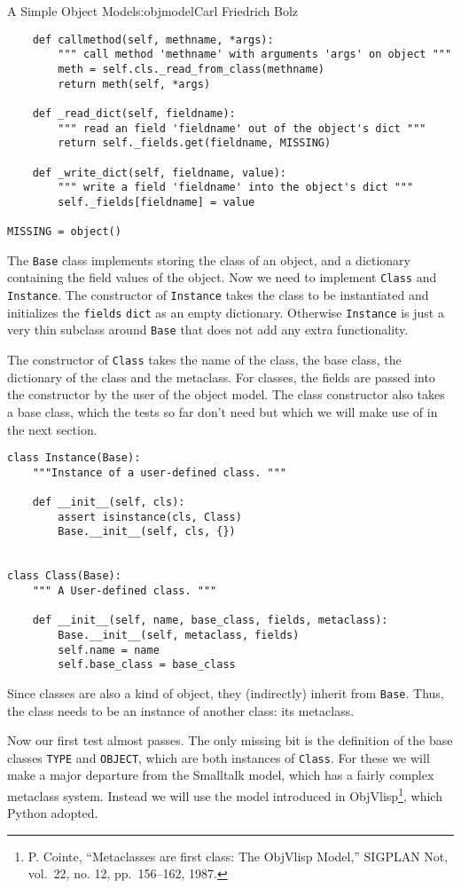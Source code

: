 \begin{aosachapter}{A Simple Object Model}{s:objmodel}{Carl Friedrich Bolz}
\begin{verbatim}
    def callmethod(self, methname, *args):
        """ call method 'methname' with arguments 'args' on object """
        meth = self.cls._read_from_class(methname)
        return meth(self, *args)

    def _read_dict(self, fieldname):
        """ read an field 'fieldname' out of the object's dict """
        return self._fields.get(fieldname, MISSING)

    def _write_dict(self, fieldname, value):
        """ write a field 'fieldname' into the object's dict """
        self._fields[fieldname] = value

MISSING = object()
\end{verbatim}

The \texttt{Base} class implements storing the class of an object, and a
dictionary containing the field values of the object. Now we need to
implement \texttt{Class} and \texttt{Instance}. The constructor of
\texttt{Instance} takes the class to be instantiated and initializes the
\texttt{fields} \texttt{dict} as an empty dictionary. Otherwise
\texttt{Instance} is just a very thin subclass around \texttt{Base} that
does not add any extra functionality.

The constructor of \texttt{Class} takes the name of the class, the base
class, the dictionary of the class and the metaclass. For classes, the
fields are passed into the constructor by the user of the object model.
The class constructor also takes a base class, which the tests so far
don't need but which we will make use of in the next section.

\begin{verbatim}
class Instance(Base):
    """Instance of a user-defined class. """

    def __init__(self, cls):
        assert isinstance(cls, Class)
        Base.__init__(self, cls, {})


class Class(Base):
    """ A User-defined class. """

    def __init__(self, name, base_class, fields, metaclass):
        Base.__init__(self, metaclass, fields)
        self.name = name
        self.base_class = base_class
\end{verbatim}

Since classes are also a kind of object, they (indirectly) inherit from
\texttt{Base}. Thus, the class needs to be an instance of another class:
its metaclass.

Now our first test almost passes. The only missing bit is the definition
of the base classes \texttt{TYPE} and \texttt{OBJECT}, which are both
instances of \texttt{Class}. For these we will make a major departure
from the Smalltalk model, which has a fairly complex metaclass system.
Instead we will use the model introduced in ObjVlisp\footnote{P. Cointe,
  ``Metaclasses are first class: The ObjVlisp Model,'' SIGPLAN Not,
  vol.~22, no. 12, pp.~156--162, 1987.}, which Python adopted.


\end{aosachapter}
